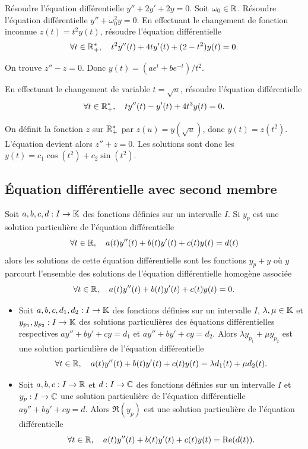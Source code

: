 \documentclass{magnoliaold}
\begin{document}
\begin{exos}
\exo Résoudre l'équation différentielle $y''+2y'+2y=0$.
\exo Soit $\omega_0\in\mathbb{R}$. Résoudre l'équation différentielle
  $y''+\omega_0^2 y=0$.
\exo En effectuant le changement de fonction inconnue $z(t)= t^2 y(t)$,
  résoudre l'équation différentielle
  \[\forall t\in\mathbb{R}_+^* ,\quad t^2 y''(t)+4ty'(t)+(2-t^2)y(t)=0.\]
  \begin{sol}
  On trouve $z''-z=0$. Donc $y(t)=(ae^t+be^{-t})/t^2$.
  \end{sol}
\exo En effectuant le changement de variable $t=\sqrt{u}$, résoudre
  l'équation différentielle
  \[\forall t\in\mathbb{R}_+^* ,\quad ty''(t)-y'(t)+4t^3y(t)=0.\]
  \begin{sol}
  On définit la fonction $z$ sur $\mathbb{R}_+^*$ par $z(u)=y(\sqrt{u})$, donc
  $y(t)=z(t^2)$. L'équation devient alors $z''+z=0$. Les solutions sont donc
  les $y(t)=c_1\cos(t^2)+c_2\sin(t^2)$.
  \end{sol}
\end{exos}

\subsection{Équation différentielle avec second membre}

\begin{proposition}[utile=-3,nom={Théorème de superposition}]
Soit $a,b,c,d:I\to\mathbb{K}$ des fonctions définies sur un intervalle $I$.
Si $y_p$ est une solution \og particulière \fg de l'équation différentielle
\[\forall t\in\mathbb{R} ,\quad a(t)y''(t)+b(t)y'(t)+c(t)y(t)=d(t)\]
alors les solutions de cette équation différentielle sont les fonctions $y_p+y$
où $y$ parcourt l'ensemble des solutions de l'équation différentielle homogène
associée
\[\forall t\in\mathbb{R} ,\quad a(t)y''(t)+b(t)y'(t)+c(t)y(t)=0.\]
\end{proposition}


\begin{proposition}[utile=-3,nom={Théorème de superposition}]
\begin{itemize}
\item Soit $a,b,c,d_1,d_2:I\to\mathbb{K}$ des fonctions définies sur un intervalle $I$, $\lambda,\mu\in\mathbb{K}$ et $y_{p_1},y_{p_2}:I\to\mathbb{K}$ des solutions \og particulières \fg des équations
  différentielles respectives $ay''+by'+cy=d_1$ et $ay''+by'+cy=d_2$. Alors
  $\lambda y_{p_1}+\mu y_{p_2}$ est une solution \og particulière \fg de l'équation différentielle
  \[\forall t\in\mathbb{R} ,\quad a(t)y''(t)+b(t)y'(t)+c(t)y(t)=
    \lambda d_1(t)+\mu d_2(t).\]
\item Soit $a,b,c:I\to\mathbb{R}$ et $d:I\to\mathbb{C}$ des fonctions définies sur un intervalle $I$ et $y_p:I\to\mathbb{C}$ une solution
  \og particulière \fg de l'équation différentielle $ay''+by'+cy=d$. Alors
  $\Re(y_p)$ est une solution \og particulière \fg de l'équation différentielle
  \[\forall t\in \mathbb{R} ,\quad a(t)y''(t)+b(t)y'(t)+c(t)y(t)=\mathop{\rm Re}(d(t)).\]
\end{itemize}
\end{proposition}
\end{document}
